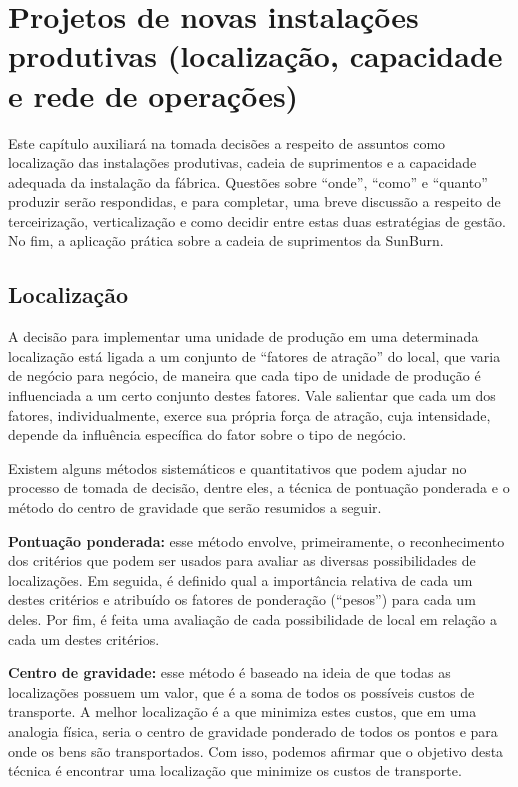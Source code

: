 
\chapter{Projetos de novas instalações produtivas (localização, capacidade e rede de operações)}
\label{chap:projetos_de_novas}

Este capítulo auxiliará na tomada decisões a respeito de assuntos como localização das instalações produtivas, cadeia de suprimentos e a capacidade adequada da instalação da fábrica. Questões sobre “onde”, “como” e “quanto” produzir serão respondidas, e para completar, uma breve discussão a respeito de terceirização, verticalização e como decidir entre estas duas estratégias de gestão. No fim, a aplicação prática sobre a cadeia de suprimentos da SunBurn.

\section{Localização}
\label{sec:projeto_de_novas_localizacao}

A decisão para implementar uma unidade de produção em uma determinada localização está ligada a um conjunto de ``fatores de atração'' do local, que varia de negócio para negócio, de maneira que cada tipo de unidade de produção é influenciada a um certo conjunto destes fatores. Vale salientar que cada um dos fatores, individualmente, exerce sua própria força de atração, cuja intensidade, depende da influência específica do fator sobre o tipo de negócio.

Existem alguns métodos sistemáticos e quantitativos que podem ajudar no processo de tomada de decisão, dentre eles, a técnica de pontuação ponderada e o método do centro de gravidade que serão resumidos a seguir.

\textbf{Pontuação ponderada:} esse método envolve, primeiramente, o reconhecimento dos critérios que podem ser usados para avaliar as diversas possibilidades de localizações. Em seguida, é definido qual a importância relativa de cada um destes critérios e atribuído os fatores de ponderação (``pesos'') para cada um deles. Por fim, é feita uma avaliação de cada possibilidade de local em relação a cada um destes critérios.

\textbf{Centro de gravidade:} esse método é baseado na ideia de que todas as localizações possuem um valor, que é a soma de todos os possíveis custos de transporte. A melhor localização é a que minimiza estes custos, que em uma analogia física, seria o centro de gravidade ponderado de todos os pontos e para onde os bens são transportados. Com isso, podemos afirmar que o objetivo desta técnica é encontrar uma localização que minimize os custos de transporte.


